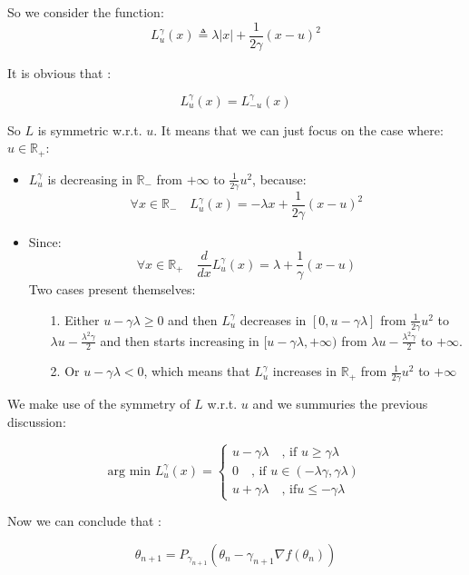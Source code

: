 	So we consider the function:
	$$L^{\gamma}_u(x)\triangleq \lambda \vert x \vert+ \frac{1}{2 \gamma}( x - u)^2$$
	
	It is obvious that :
	
	$$L^{\gamma}_u(x) = L^{\gamma}_{-u}(x)$$
	
	So $L$ is symmetric w.r.t. $u$. It means that we can just focus on the case where: $u \in \mathbb{R}_+$:
	
	\begin{itemize}
		\item $L^{\gamma}_u$ is decreasing in $ \mathbb{R}_- $ from $+\infty$ to $\frac{1}{2 \gamma}u^2$, because:
		$$\forall x \in \mathbb{R}_- \quad L^{\gamma}_u(x)=-\lambda x + \frac{1}{2 \gamma}( x - u)^2$$
		\item  Since: 
		$$\forall x \in \mathbb{R}_+ \quad \frac{d}{dx}L^{\gamma}_u(x)=\lambda + \frac{1}{\gamma} (x-u)$$
		Two cases present themselves:
		\begin{itemize}
			\item [1. ] Either $u-\gamma \lambda \geq 0 $ and then  $L^{\gamma}_u$ decreases in $ [0,u-\gamma \lambda]$ from $\frac{1}{2 \gamma}u^2$ to $\lambda u -\frac{\lambda^2 \gamma}{2} $ and then starts increasing in $[u-\gamma \lambda,+\infty)$ from $\lambda u -\frac{\lambda^2 \gamma}{2} $ to $+\infty$.
			
			\item[2. ] Or $u-\gamma \lambda < 0 $, which means that $L^{\gamma}_u$ increases in $\mathbb{R}_+$ from $\frac{1}{2 \gamma}u^2$ to $+\infty$
		\end{itemize}
	\end{itemize}
	
	We make use of the symmetry of $L$ w.r.t. $u$ and we summuries the previous discussion: 
	
	$$\text{arg min }L^{\gamma}_u(x)=
	\begin{cases}
	u-\gamma \lambda \quad \text{, if } u\geq \gamma \lambda \\
	0 \quad \text{, if } u \in (-\lambda \gamma,\gamma \lambda)\\
	u+\gamma \lambda \quad \text{, if} u\leq -\gamma \lambda
	\end{cases}$$
	
	Now we can conclude that :
	
	$$\theta_{n+1}=P_{\gamma_{n+1}} (\theta_n-\gamma_{n+1}\nabla f(\theta_n))$$
	
	
	
